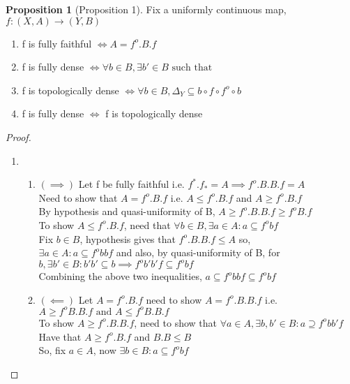 \documentclass[18pt,a4paper]{article}
\theoremstyle{definition}
\newtheorem{proop}{Proposition}[section]
\begin{document}
\begin{proop}[Proposition 1]
	Fix a uniformly continuous map, $f:(X,A) \rightarrow (Y,B)$
	\begin{enumerate}[label=(\alph*)]
		\item f is fully faithful $\iff A=f^o.B.f$
		\item f is fully dense $\iff \forall b\in B, \exists b' \in B \text{ such that }  $
		\item f is topologically dense $\iff\forall b\in B,\Delta_Y\subseteq b\circ f\circ f^o\circ b$
		\item f is fully dense $\iff$ f is topologically dense
	\end{enumerate}
\end{proop}
\begin{proof}
\item
	\begin{enumerate}[label=(\alph*)]
		\item \begin{enumerate}[label=(\roman*)]
			\item $ (\implies) $ Let f be fully faithful i.e. $f^*.f_*=A
				\implies f^o .B.B.f=A $\\
				Need to show that $A= f^o .B.f$ i.e.
				$A\leq f^o .B.f$ and  $A\geq f^o .B.f$\\
				By hypothesis and quasi-uniformity of B,
				$A\geq f^o .B.B.f \geq f^o B.f $\\
				To show $A \leq f^o .B.f$, need that $\forall b \in B, \exists a
				\in A : a \subseteq f^o bf$\\
				Fix $b\in B$, hypothesis gives that $f^o .B.B.f \leq A$ so, \\
				$\exists a \in A: a \subseteq f^o bbf$ and also, by
				quasi-uniformity of B, for $b, \exists b' \in B : b'b' \subseteq b
				\implies f^o b'b'f \subseteq f^o bf$\\
				Combining the above two inequalities,
				$a \subseteq f^o bbf \subseteq f^o bf$\\
			\item $(\impliedby)$ Let $A=f^o .B.f$ need to show $A=f^o.B.B.f$ i.e.
				$A\geq f^o B.B.f \text{ and } A\leq f^o B.B.f$\\
				To show $A\geq f^o .B.B.f$, need to show that $\forall a\in A,
				\exists b,b' \in B : a \supseteq f^o bb'f$\\
				Have that $A\geq f^o .B.f$ and $B.B \leq B$\\
				So, fix $a \in A$, now $\exists b\in B: a \subseteq f^o bf$

\end{enumerate}
\end{enumerate}
\end{proof}
\end{document}

